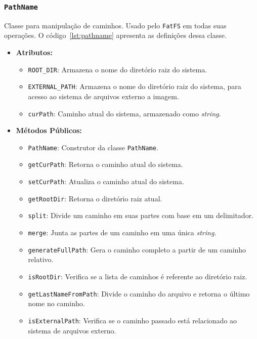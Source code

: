 \documentclass[
    12pt,				%
    oneside,   	        %
    a4paper,			%
    english,			%
    french,				%
    spanish,			%
    brazil,				%
    ]{pacotes/abntex2}
\begin{document}
\subsubsection{\texttt{PathName}}
\label{subsubsec:path_name}

Classe para manipulação de caminhos. Usado pelo \texttt{FatFS} em todas suas operações. O código~\ref{lst:pathname} apresenta as definições dessa classe.

\begin{itemize}
    \item \textbf{Atributos:}
        \begin{itemize}
            \item \texttt{ROOT\_DIR}: Armazena o nome do diretório raiz do sistema.
            \item \texttt{EXTERNAL\_PATH}: Armazena o nome do diretório raiz do sistema, para acesso ao sistema de arquivos externo a imagem.
            \item \texttt{curPath}: Caminho atual do sistema, armazenado como \textit{string}.
        \end{itemize}
    \item \textbf{Métodos Públicos:}
        \begin{itemize}
            \item \texttt{PathName}: Construtor da classe \texttt{PathName}.
            \item \texttt{getCurPath}: Retorna o caminho atual do sistema.
            \item \texttt{setCurPath}: Atualiza o caminho atual do sistema.
            \item \texttt{getRootDir}: Retorna o diretório raiz atual.
            \item \texttt{split}: Divide um caminho em suas partes com base em um delimitador.
            \item \texttt{merge}: Junta as partes de um caminho em uma única \textit{string}.
            \item \texttt{generateFullPath}: Gera o caminho completo a partir de um caminho relativo.
            \item \texttt{isRootDir}: Verifica se a lista de caminhos é referente ao diretório raiz.
            \item \texttt{getLastNameFromPath}: Divide o caminho do arquivo e retorna o último nome no caminho.
            \item \texttt{isExternalPath}: Verifica se o caminho passado está relacionado ao sistema de arquivos externo.
        \end{itemize}
\end{itemize}
\end{document}
